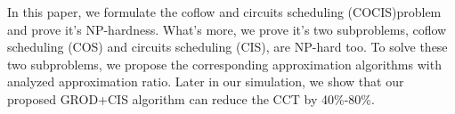 In this paper, we formulate the coflow and circuits scheduling (COCIS)problem and prove it's NP-hardness. What's more, we prove it's two subproblems, coflow scheduling (COS) and circuits scheduling (CIS), are NP-hard too. To solve these two subproblems, we propose the corresponding approximation algorithms with analyzed approximation ratio. Later in our simulation, we show that our proposed GROD+CIS algorithm can reduce the CCT by 40\%-80\%.
